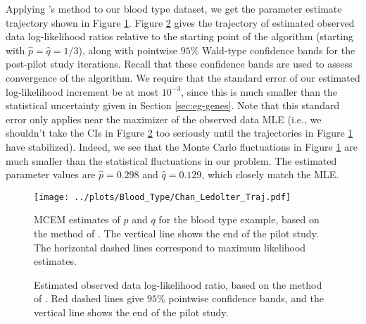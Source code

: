 \documentclass[11pt, oneside]{article}   	%
\begin{document}
Applying \citeauthor{Cha95}'s method to our blood type dataset, we get the parameter estimate trajectory shown in Figure \ref{fig:blood_CL_MCEM_estimates}. Figure \ref{fig:blood_CL_MCEM_likelihoods} gives the trajectory of estimated observed data log-likelihood ratios relative to the starting point of the algorithm (starting with $\hat{p} = \hat{q} = 1/3$), along with pointwise $95\%$ Wald-type confidence bands for the post-pilot study iterations. Recall that these confidence bands are used to assess convergence of the algorithm. We require that the standard error of our estimated log-likelihood increment be at most $10^{-3}$, since this is much smaller than the statistical uncertainty given in Section \ref{sec:eg-genes}. Note that this standard error only applies near the maximizer of the observed data MLE (i.e., we shouldn't take the CIs in Figure \ref{fig:blood_CL_MCEM_likelihoods} too seriously until the trajectories in Figure \ref{fig:blood_CL_MCEM_estimates} have stabilized). Indeed, we see that the Monte Carlo fluctuations in Figure \ref{fig:blood_CL_MCEM_estimates} are much smaller than the statistical fluctuations in our problem. The estimated parameter values are $\hat{p} = 0.298$ and $\hat{q} = 0.129$, which closely match the MLE.

\begin{figure}
    \centering
    \caption{MCEM estimates of $p$ and $q$ for the blood type example, based on the method of \citet{Cha95}. The vertical line shows the end of the pilot study. The horizontal dashed lines correspond to maximum likelihood estimates.}
    \texttt{[image: ../plots/Blood\_Type/Chan\_Ledolter\_Traj.pdf]} 
    \label{fig:blood_CL_MCEM_estimates}
\end{figure}

\begin{figure}
    \centering
    \caption{Estimated observed data log-likelihood ratio, based on the method of \citet{Cha95}. Red dashed lines give $95\%$ pointwise confidence bands, and the vertical line shows the end of the pilot study.}

    
    \label{fig:blood_CL_MCEM_likelihoods}
\end{figure}
\end{document}
